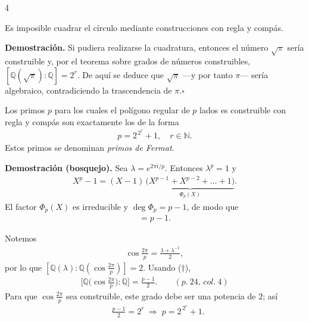 \documentclass[landscape,a4paper]{article}
\begin{document}
\begin{multicols}{4}
\begin{tcolorbox}[colback=white,colframe=red!80!black,colbacktitle=red!80!black,coltitle=white,title={Proposición: Cuadratura del círculo (p.~24, col.~2)}]
Es imposible cuadrar el círculo mediante construcciones con regla y compás.
\end{tcolorbox}
\noindent\textbf{Demostración.} Si pudiera realizarse la cuadratura, entonces el número $\sqrt{\pi}$ sería construible y, por el teorema sobre grados de números construibles,\linebreak
$[\mathbb{Q}(\sqrt{\pi}):\mathbb{Q}] = 2^{r}$. De aquí se deduce que $\sqrt{\pi}$ —y por tanto $\pi$— sería algebraico, contradiciendo la trascendencia de $\pi$.\hfill$\square$

\begin{tcolorbox}[colback=white,colframe=red!80!black,colbacktitle=red!80!black,coltitle=white,title={Teorema: Polígonos regulares construibles (p.~24, col.~3)}]
Los primos $p$ para los cuales el polígono regular de $p$ lados es construible con regla y compás son exactamente los de la forma
\begin{align*}
  p = 2^{\,2^{r}} + 1,\quad r \in \mathbb{N}. 
\end{align*}
Estos primos se denominan \emph{primos de Fermat}.
\end{tcolorbox}
\noindent\textbf{Demostración (bosquejo).} Sea $\lambda = e^{2\pi i/p}$. Entonces $\lambda^{p} = 1$ y
\begin{align*}
  X^{p} - 1 = (X-1)\,\underbrace{\bigl(X^{p-1}+X^{p-2}+\dots+1\bigr)}_{\Phi_{p}(X)}.
\end{align*}
El factor $\Phi_{p}(X)$ es irreducible y $\deg \Phi_{p}=p-1$, de modo que
\begin{align*}
  [\mathbb{Q}(\lambda):\mathbb{Q}] = p-1. \tag*{(†)}
\end{align*}

Notemos
\begin{align*}
  \cos\frac{2\pi}{p} = \frac{\lambda + \lambda^{-1}}{2},
\end{align*}
por lo que $[\mathbb{Q}(\lambda):\mathbb{Q}(\cos\frac{2\pi}{p})]=2$. Usando (†),
\begin{align*}
  \bigl[\mathbb{Q}\bigl(\cos\tfrac{2\pi}{p}\bigr):\mathbb{Q}\bigr] = \frac{p-1}{2}. \qquad(p.~24,\,col.~4)
\end{align*}
Para que $\cos\tfrac{2\pi}{p}$ sea construible, este grado debe ser una potencia de $2$; así
\begin{align*}
  &\frac{p-1}{2} = 2^{r} \;\Longrightarrow\;  p = 2^{\,2^{r}} + 1.
\end{align*}


\end{multicols}
\end{document}
